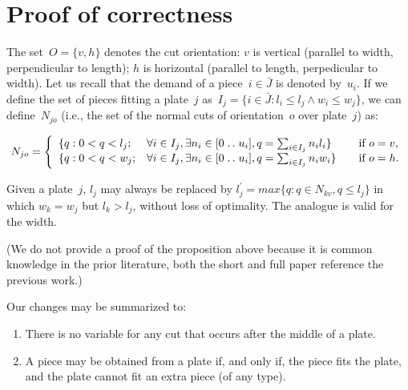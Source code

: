 \documentclass[9pt]{entcs}
\newcommand{\isep}{\mathrel{{.}\,{.}}\nobreak} %
\begin{document}
\section{Proof of correctness}

The set~\(O = \{v, h\}\) denotes the cut orientation: \(v\) is vertical (parallel to width, perpendicular to length); \(h\) is horizontal (parallel to length, perpedicular to width).
Let us recall that the demand of a piece~\(i \in \bar{J}\) is denoted by~\(u_i\).
If we define the set of pieces fitting a plate~\(j\) as~\(I_j = \{i \in \bar{J} : l_i \leq l_j \land w_i \leq w_j \}\), we can define~\(N_{jo}\) (i.e., the set of the normal cuts of orientation~\(o\) over plate~\(j\)) as:

\begin{equation}
N_{jo}= \left\{
\begin{array}{lllr}
  \{q: 0 < q < l_j; & \forall i \in I_j, \exists n_i \in [0 \isep u_i], q = \sum_{i\in I_j} n_i l_i \} & \quad \text{if } o = v,\\
  \{q: 0 < q < w_j; & \forall i \in I_j, \exists n_i \in [0 \isep u_i], q = \sum_{i\in I_j} n_i w_i \} & \quad \text{if } o = h.
\end{array}\right.
\end{equation}

\begin{proposition}
\label{pro:normalization}
Given a plate~\(j\), \(l_j\) may always be replaced by \(l^\prime_j = max\{q : q \in N_{kv}, q \leq l_j\}\) in which \(w_k = w_j\) but \(l_k > l_j\), without loss of optimality.
The analogue is valid for the width.
\end{proposition}

(We do not provide a proof of the proposition above because it is common knowledge in the prior literature, both the short and full paper reference the previous work.)

Our changes may be summarized to:

\begin{enumerate}
\item There is no variable for any cut that occurs after the middle of a plate.
\item A piece may be obtained from a plate if, and only if, the piece fits the plate, and the plate cannot fit an extra piece (of any type).
\end{enumerate}
\end{document}
